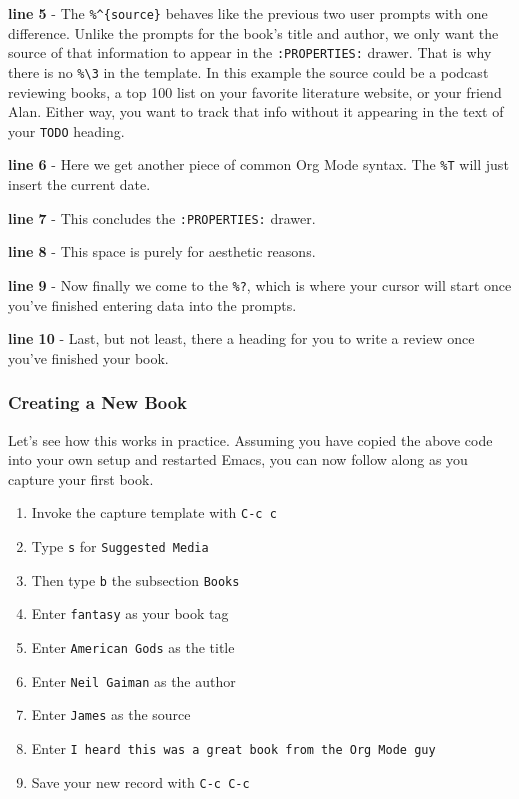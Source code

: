 \documentclass[11pt]{article}
\begin{document}
\textbf{line 5} - The \texttt{\%\textasciicircum{}\{source\}} behaves like the previous two user prompts with one difference. Unlike the prompts for the book's title and author, we only want the source of that information to appear in the \texttt{:PROPERTIES:} drawer. That is why there is no \texttt{\%\textbackslash{}3} in the template. In this example the source could be a podcast reviewing books, a top 100 list on your favorite literature website, or your friend Alan. Either way, you want to track that info without it appearing in the text of your \texttt{TODO} heading.

\textbf{line 6} - Here we get another piece of common Org Mode syntax. The \texttt{\%T} will just insert the current date.

\textbf{line 7} - This concludes the \texttt{:PROPERTIES:} drawer.

\textbf{line 8} - This space is purely for aesthetic reasons.

\textbf{line 9} - Now finally we come to the \texttt{\%?}, which is where your cursor will start once you've finished entering data into the prompts.

\textbf{line 10} - Last, but not least, there a heading for you to write a review once you've finished your book.
\subsubsection*{Creating a New Book}
\label{sec:org7929062}
Let's see how this works in practice. Assuming you have copied the above code into your own setup and restarted Emacs, you can now follow along as you capture your first book.

\begin{enumerate}
\item Invoke the capture template with \texttt{C-c c}
\item Type \texttt{s} for \texttt{Suggested Media}
\item Then type \texttt{b} the subsection \texttt{Books}
\item Enter \texttt{fantasy} as your book tag
\item Enter \texttt{American Gods} as the title
\item Enter \texttt{Neil Gaiman} as the author
\item Enter \texttt{James} as the source
\item Enter \texttt{I heard this was a great book from the Org Mode guy}
\item Save your new record with \texttt{C-c C-c}
\end{enumerate}
\end{document}
